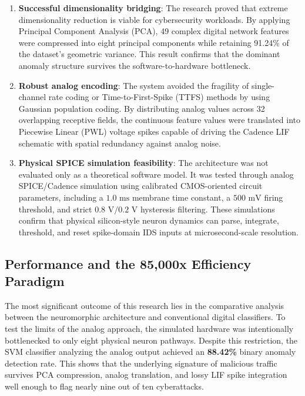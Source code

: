 \documentclass{ieeeaccess}
\begin{document}
\begin{enumerate}
\item \textbf{Successful dimensionality bridging}: The research proved that extreme dimensionality reduction is viable for cybersecurity workloads. By applying Principal Component Analysis (PCA), 49 complex digital network features were compressed into eight principal components while retaining 91.24\% of the dataset's geometric variance. This result confirms that the dominant anomaly structure survives the software-to-hardware bottleneck.

\item \textbf{Robust analog encoding}: The system avoided the fragility of single-channel rate coding or Time-to-First-Spike (TTFS) methods by using Gaussian population coding. By distributing analog values across 32 overlapping receptive fields, the continuous feature values were translated into Piecewise Linear (PWL) voltage spikes capable of driving the Cadence LIF schematic with spatial redundancy against analog noise.

\item \textbf{Physical SPICE simulation feasibility}: The architecture was not evaluated only as a theoretical software model. It was tested through analog SPICE/Cadence simulation using calibrated CMOS-oriented circuit parameters, including a $1.0\text{ ms}$ membrane time constant, a $500\text{ mV}$ firing threshold, and strict $0.8\text{ V}/0.2\text{ V}$ hysteresis filtering. These simulations confirm that physical silicon-style neuron dynamics can parse, integrate, threshold, and reset spike-domain IDS inputs at microsecond-scale resolution.
\end{enumerate}

\subsection{Performance and the 85,000x Efficiency Paradigm}
The most significant outcome of this research lies in the comparative analysis between the neuromorphic architecture and conventional digital classifiers. To test the limits of the analog approach, the simulated hardware was intentionally bottlenecked to only eight physical neuron pathways. Despite this restriction, the SVM classifier analyzing the analog output achieved an \textbf{88.42\%} binary anomaly detection rate. This shows that the underlying signature of malicious traffic survives PCA compression, analog translation, and lossy LIF spike integration well enough to flag nearly nine out of ten cyberattacks.
\end{document}
